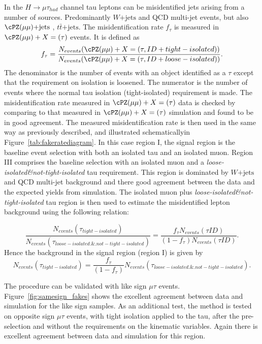 In the $H \rightarrow \mu \tau_{had}$ channel tau leptons can be misidentified jets arising from a number of sources. Predominantly  $W\mathrm{+jets}$ and QCD multi-jet events, but also
 $\cPZ(\mu \mu) \mathrm{+jets}$ , $t\bar{t} \mathrm{+jets}$. The misidentification rate $f_{\tau}$ is measured in $\cPZ(\mu \mu) +X=(\tau)$ events. It is
defined as
\begin{equation*}
f_{\tau}= \frac{N_{events}(\cPZ(\mu \mu) +X=(\tau, ID+tight-isolated))}
               {N_{events}(\cPZ(\mu \mu) +X=(\tau, ID+loose-isolated))}.
\end{equation*}
The denominator is the number of events with an object identified as a $\tau$
except that the requirement on isolation is loosened. The
numerator is the number of events where the normal tau isolation (tight-isolated) requirement is made.
The misidentification rate  measured in  $\cPZ(\mu \mu) +X=(\tau)$ data is checked by comparing to that
measured in $\cPZ(\mu \mu) +X=(\tau)$ simulation and found to be in good agreement.
The measured misidentification rate is then used in the same way as previously described, and illustrated schematicallyin Figure~\ref{tab:fakeratediagram}. In this case region I, the signal region is the baseline
event selection with both an isolated tau and an isolated muon. Region III comprises the baseline
selection with an isolated muon and a {\it loose-isolated\&not-tight-isolated} tau  requirement.
This region is dominated by $W\mathrm{+jets}$ and QCD multi-jet background and there good agreement between the
data and the expected yields from simulation. The isolated muon plus
{\it loose-isolated\&not-tight-isolated} tau  region is then used  to estimate the misidentified lepton  background using the following relation:

\begin{equation*}
\frac{N_{events}(\tau_{tight-isolated})}
     {N_{events}(\tau_{loose-isolated.\&.not-tight-isolated})}
= 
\frac{f_{\tau}N_{events}(\tau ID)}
     {(1-f_{\tau})N_{events}(\tau ID)}.
\end{equation*}
Hence the background in the signal region (region I) is given by
\begin{equation*}
N_{events}(\tau_{ tight-isolated})= 
\frac{f_{\tau}}
     {(1-f_{\tau})}N_{events}(\tau_{loose-isolated.\&.not-tight-isolated}).
\end{equation*}

The procedure can be validated with like sign $\mu\tau$ events. Figure~\ref{fig:samesign_fakes}
shows the excellent agreement between data and simulation for the like sign samples.
As an additional test, the method is tested on opposite sign $\mu\tau$ events, with tight
isolation applied to the tau, after the pre-selection and without the requirements on the kinematic variables.
Again there is excellent agreement between  data and simulation for this region.

